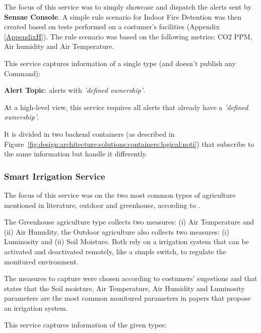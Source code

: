 The focus of this service was to simply showcase and dispatch the alerts sent by \textbf{Sensae Console}. A simple rule scenario for Indoor Fire Detention was then created based on tests performed on a costumer's facilities (Appendix \ref{AppendixH}). The rule scenario was based on the following metrics: CO2 \gls{PPM}, Air humidity and Air Temperature.

This service captures information of a single type (and doesn't publish any Command):

\textbf{Alert Topic}: alerts with \textit{'defined ownership'}.

At a high-level view, this service requires all alerts that already have a \textit{'defined ownership'}.

It is divided in two backend containers (as described in Figure~\ref{fig:design:architecture:solutions:containers:logical:noti}) that subscribe to the same information but handle it differently.

\subsubsection{Smart Irrigation Service}
\label{subsubsec:implementation:description:services:irrigation}

The focus of this service was on the two most common types of agriculture mentioned in literature, outdoor and greenhouse, according to \cite{garcia2020iot}.

The Greenhouse agriculture type collects two measures: (i) Air Temperature and (ii) Air Humidity, the Outdoor agriculture also collects two measures: (i) Luminosity and (ii) Soil Moisture. Both rely on a irrigation system that can be activated and deactivated remotely, like a simple switch, to regulate the monitured environment.

The measures to capture were chosen according to costumers' sugestions and \cite{garcia2020iot} that states that the Soil moisture, Air Temperature, Air Humidity and Luminosity parameters are the most common monitured parameters in papers that propose an irrigation system. 

This service captures information of the given types:

